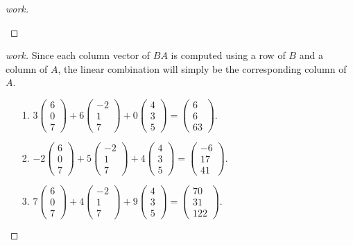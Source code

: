 \documentclass{article}
\begin{document}
\begin{enumerate}
{\begin{enumerate}
\begin{proof}[work]
\begin{enumerate}
                \end{enumerate}
            \end{proof}
            \begin{proof}[work] Since each column vector of $BA$ is computed using a row of $B$ and a column of $A$, the linear combination will simply be the corresponding column of $A$.
                \begin{enumerate}
                    \item[1.] $3\begin{pmatrix}6 \\ 0 \\ 7\end{pmatrix} + 6\begin{pmatrix}-2 \\ 1 \\ 7\end{pmatrix} + 0\begin{pmatrix}4 \\ 3 \\ 5\end{pmatrix} = \begin{pmatrix}6 \\ 6 \\ 63\end{pmatrix}$.
                    \item[2.] $-2\begin{pmatrix}6 \\ 0 \\ 7\end{pmatrix} + 5\begin{pmatrix}-2 \\ 1 \\ 7\end{pmatrix} + 4\begin{pmatrix}4 \\ 3 \\ 5\end{pmatrix} = \begin{pmatrix}-6 \\ 17 \\ 41\end{pmatrix}$.
                    \item[3.] $7\begin{pmatrix}6 \\ 0 \\ 7\end{pmatrix} + 4\begin{pmatrix}-2 \\ 1 \\ 7\end{pmatrix} + 9\begin{pmatrix}4 \\ 3 \\ 5\end{pmatrix} = \begin{pmatrix}70 \\ 31 \\ 122\end{pmatrix}$.

\end{enumerate}
\end{proof}
\end{enumerate}}
\end{enumerate}
\end{document}
